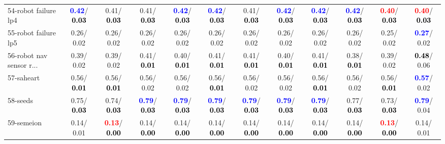 \begin{table}[h]
\begin{center}
{\begin{tabular}{lc|c|c|c|c|c|c|c|c|c|c}
54-robot failure lp4 & \textcolor{blue}{\textbf{  0.42}}/\textcolor{black}{\textbf{  0.03}} &   0.41/\textcolor{black}{\textbf{  0.03}} &   0.41/\textcolor{black}{\textbf{  0.03}} & \textcolor{blue}{\textbf{  0.42}}/\textcolor{black}{\textbf{  0.03}} & \textcolor{blue}{\textbf{  0.42}}/\textcolor{black}{\textbf{  0.03}} &   0.41/\textcolor{black}{\textbf{  0.03}} & \textcolor{blue}{\textbf{  0.42}}/\textcolor{black}{\textbf{  0.03}} & \textcolor{blue}{\textbf{  0.42}}/\textcolor{black}{\textbf{  0.03}} & \textcolor{blue}{\textbf{  0.42}}/\textcolor{black}{\textbf{  0.03}} & \textcolor{red}{\textbf{  0.40}}/\textcolor{black}{\textbf{  0.03}} & \textcolor{red}{\textbf{  0.40}}/\textcolor{black}{\textbf{  0.03}} \\
55-robot failure lp5 &   0.26/  0.02 &   0.26/  0.02 &   0.26/  0.02 &   0.26/  0.02 &   0.26/  0.02 &   0.26/  0.02 &   0.26/  0.02 &   0.26/  0.02 &   0.26/  0.02 &   0.25/  0.02 & \textcolor{blue}{\textbf{  0.27}}/  0.02 \\
56-robot nav sensor r... &   0.39/  0.02 &   0.39/  0.02 &   0.41/\textcolor{black}{\textbf{  0.01}} &   0.40/\textcolor{black}{\textbf{  0.01}} &   0.41/\textcolor{black}{\textbf{  0.01}} &   0.41/\textcolor{black}{\textbf{  0.01}} &   0.40/\textcolor{black}{\textbf{  0.01}} &   0.41/\textcolor{black}{\textbf{  0.01}} &   0.38/\textcolor{black}{\textbf{  0.01}} &   0.39/  0.02 & \textcolor{black}{\textbf{  0.48}}/  0.06 \\
57-saheart &   0.56/\textcolor{black}{\textbf{  0.01}} &   0.56/\textcolor{black}{\textbf{  0.01}} &   0.56/  0.02 &   0.56/  0.02 &   0.56/\textcolor{black}{\textbf{  0.01}} &   0.56/  0.02 &   0.56/  0.02 &   0.56/\textcolor{black}{\textbf{  0.01}} &   0.56/  0.02 &   0.56/\textcolor{black}{\textbf{  0.01}} & \textcolor{blue}{\textbf{  0.57}}/  0.02 \\
58-seeds &   0.75/\textcolor{black}{\textbf{  0.03}} &   0.74/\textcolor{black}{\textbf{  0.03}} & \textcolor{blue}{\textbf{  0.79}}/\textcolor{black}{\textbf{  0.03}} & \textcolor{blue}{\textbf{  0.79}}/\textcolor{black}{\textbf{  0.03}} & \textcolor{blue}{\textbf{  0.79}}/\textcolor{black}{\textbf{  0.03}} & \textcolor{blue}{\textbf{  0.79}}/\textcolor{black}{\textbf{  0.03}} & \textcolor{blue}{\textbf{  0.79}}/\textcolor{black}{\textbf{  0.03}} & \textcolor{blue}{\textbf{  0.79}}/\textcolor{black}{\textbf{  0.03}} &   0.77/\textcolor{black}{\textbf{  0.03}} &   0.73/\textcolor{black}{\textbf{  0.03}} & \textcolor{blue}{\textbf{  0.79}}/  0.04 \\
59-semeion &   0.14/  0.01 & \textcolor{red}{\textbf{  0.13}}/\textcolor{black}{\textbf{  0.00}} &   0.14/\textcolor{black}{\textbf{  0.00}} &   0.14/\textcolor{black}{\textbf{  0.00}} &   0.14/\textcolor{black}{\textbf{  0.00}} &   0.14/\textcolor{black}{\textbf{  0.00}} &   0.14/\textcolor{black}{\textbf{  0.00}} &   0.14/\textcolor{black}{\textbf{  0.00}} &   0.14/\textcolor{black}{\textbf{  0.00}} & \textcolor{red}{\textbf{  0.13}}/\textcolor{black}{\textbf{  0.00}} &   0.14/  0.01 \\

\end{tabular}}
\end{center}
\end{table}

